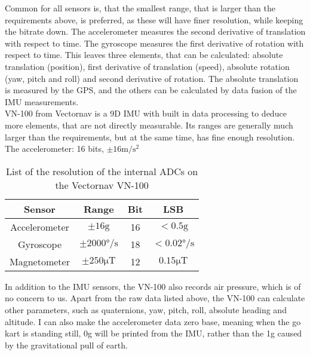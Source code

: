Common for all sensors is, that the smallest range, that is larger than the requirements above, is preferred, as these will have finer resolution, while keeping the bitrate down.
The accelerometer measures the second derivative of translation with respect to time. 
The gyroscope measures the first derivative of rotation with respect to time.
This leaves three elements, that can be calculated: absolute translation (position), first derivative of translation (speed), absolute rotation (yaw, pitch and roll) and second derivative of rotation.
The absolute translation is measured by the GPS, and the others can be calculated by data fusion of the IMU measurements.\\

VN-100 from Vectornav is a 9D IMU with built in data processing to deduce more elements, that are not directly measurable.
Its ranges are generally much larger than the requirements, but at the same time, has fine enough resolution.
The accelerometer: 16 bits,  $\pm 16 \si{\meter \per \second \squared}$

\begin{table}
	\centering
	\begin{tabular}{ c | c c c}
		{\textbf{Sensor}} & {\textbf{Range}} & {\textbf{Bit}} & {\textbf{LSB}}\\
		\hline
		{Accelerometer}	& { $\pm 16 \mathrm{g}$}					& {16}	& {$< 0.5 \mathrm{g}$}\\
		{Gyroscope}		& { $\pm 2000\si{\degree \per \second}$ }	& {18}	& {$<0.02 \si{\degree \per \second}$}\\
		{Magnetometer}	& { $\pm 250 \si{\micro \tesla}$}			& {12}	& {$0.15 \si{\micro \tesla}$}
	\end{tabular}
	\caption{List of the resolution of the internal ADCs on the Vectornav VN-100}
	\label{tab:vectornav_measurement_resolution}
\end{table}

In addition to the IMU sensors, the VN-100 also records air pressure, which is of no concern to us.
Apart from the raw data listed above, the VN-100 can calculate other parameters, such as quaternions, yaw, pitch, roll, absolute heading and altitude.
I can also make the accelerometer data zero base, meaning when the go kart is standing still, 0g will be printed from the IMU, rather than the 1g caused by the gravitational pull of earth. \\

